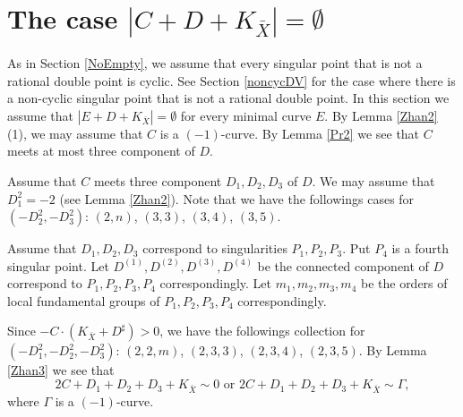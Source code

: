 \documentclass[10pt,oneside,reqno]{amsart}
\theoremstyle{definition}
\theoremstyle{remark}
\numberwithin{equation}{section}
\begin{document}
\section{The case $|C+D+K_{\bar{X}}|=\emptyset$}\label{Empty}
As in Section \ref{NoEmpty}, we assume that every singular point that is not a rational double point is cyclic. See Section \ref{noncycDV} for the case where there is a non-cyclic singular point that is not a rational double point. In this section we assume that $|E+D+K_{\bar{X}}|=\emptyset$ for every minimal curve $E$.
By Lemma \ref{Zhan2} (1), we may assume that $C$ is a $(-1)$-curve. By Lemma \ref{Pr2} we see that $C$ meets at most three component of $D$.

Assume that $C$ meets three component $D_1, D_2, D_3$ of $D$. We may assume that $D_1^2= -2$ (see Lemma \ref{Zhan2}). Note that we have the followings cases for $(-D_2^2,-D_3^2)$: $(2,n)$, $(3,3)$, $(3,4)$, $(3,5)$.

Assume that $D_1, D_2, D_3$ correspond to singularities $P_1,P_2,P_3$. Put $P_4$ is a fourth singular point. Let $D^{(1)}, D^{(2)}, D^{(3)}, D^{(4)}$ be the connected component of $D$ correspond to $P_1, P_2, P_3, P_4$ correspondingly. Let $m_1, m_2, m_3, m_4$ be the orders of local fundamental groups of $P_1, P_2, P_3, P_4$ correspondingly.


Since $-C\cdot(K_{\bar{X}}+D^{\sharp})>0$, we have the followings collection for $(-D_1^2,-D_2^2,-D_3^2)$: $(2,2,m)$, $(2,3,3)$, $(2,3,4)$, $(2,3,5)$. By Lemma \ref{Zhan3} we see that \[2C+D_1+D_2+D_3+K_{\bar{X}}\sim 0\text{ or }2C+D_1+D_2+D_3+K_{\bar{X}}\sim \Gamma,\] where $\Gamma$ is a $(-1)$-curve.
\end{document}
